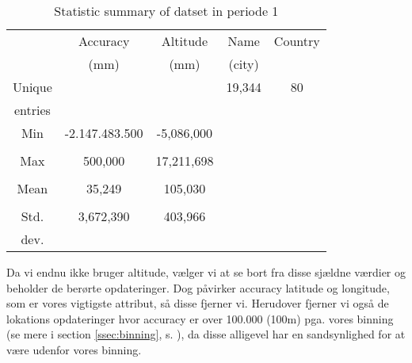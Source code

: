 \begin{table}[H]
        \centering
        \small
        \setlength\tabcolsep{2pt}
        \begin{tabular}{|c|c|c|c|c|}
            \hline
                         & Accuracy           & Altitude    & Name   & Country  \\[-3pt]%
                         &  (mm)              & (mm)        & (city) &          \\
            \hline
                 Unique  &                    &             & 19,344 & 80        \\
                 entries &                    &             &        &           \\
            \hline
                 Min     &  -2.147.483.500    & -5,086,000  &        &           \\
                         &                    &             &        &           \\
            \hline
                 Max     &  500,000           & 17,211,698  &        &           \\
                         &                    &             &        &           \\
            \hline
                 Mean    & 35,249             & 105,030     &        &           \\
                         &                    &             &        &           \\
            \hline
                 Std.    & 3,672,390          & 403,966     &        &           \\
                 dev.    &                    &             &        &           \\
            \hline
        \end{tabular}
        \caption{Statistic summary of datset in periode 1} %
        \label{tab:stat_geo_p1}
\end{table}



Da vi endnu ikke bruger altitude, vælger vi at se bort fra disse sjældne værdier og beholder de berørte opdateringer. Dog påvirker accuracy latitude og longitude, som er vores vigtigste attribut, så disse fjerner vi. Herudover fjerner vi også de lokations opdateringer hvor accuracy er over 100.000 (100m) pga. vores binning (se mere i section \ref{ssec:binning}, s. \pageref{ssec:binning}), da disse alligevel har en sandsynlighed for at være udenfor vores binning. 

